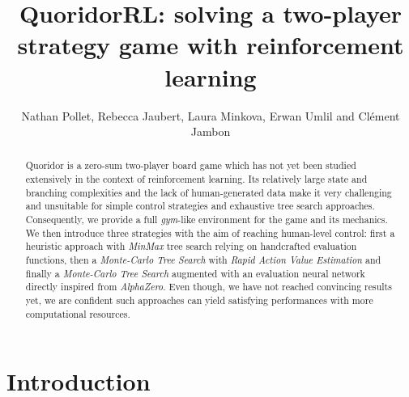 \documentclass[journal, a4paper]{IEEEtran}
\newif\ifanonymous
\begin{document}
\title{QuoridorRL: solving a two-player strategy game with reinforcement learning}
\ifanonymous
\author{Anonymous Authors}
\else
\author{Nathan Pollet, Rebecca Jaubert, Laura Minkova, Erwan Umlil and Clément Jambon}
\fi
\maketitle

\begin{abstract}
Quoridor is a zero-sum two-player board game which has not yet been studied extensively in the context of reinforcement learning. Its relatively large state and branching complexities and the lack of human-generated data make it very challenging and unsuitable for simple control strategies and exhaustive tree search approaches. Consequently, we provide a full \textit{gym}-like environment for the game and its mechanics. We then introduce three strategies with the aim of reaching human-level control: first a heuristic approach with \textit{MinMax} tree search relying on handcrafted evaluation functions, then a \textit{Monte-Carlo Tree Search} with \textit{Rapid Action Value Estimation} and finally a \textit{Monte-Carlo Tree Search} augmented with an evaluation neural network directly inspired from \textit{AlphaZero}. Even though, we have not reached convincing results yet, we are confident such approaches can yield satisfying performances with more computational resources.
\end{abstract}

\section{Introduction}
\label{sec:intro}
\end{document}
